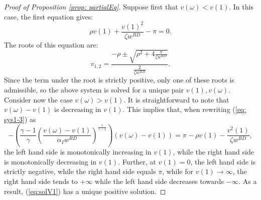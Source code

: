 \begin{proof}[Proof of Proposition \ref{prop: partialEq}]
Suppose first that $v(\omega)<v(1).$ In this case, the first equation
gives:
\[
\rho v(1)+\frac{v(1)^{2}}{\zeta w^{RD}}-\pi=0.
\]
The roots of this equation are:
\[
v_{1,2}=\frac{-\rho\pm\sqrt{\rho^{2}+4\frac{\pi}{\zeta w^{RD}}}}{\frac{2}{\zeta w^{RD}}}.
\]
Since the term under the root is strictly positive, only one of these
roots is admissible, so the above system is solved for a unique pair
$v(1),v(\omega).$ Consider now the case $v(\omega)>v(1).$ It is
straightforward to note that $v(\omega)-v(1)$ is decreasing in $v(1).$
This implies that, when rewriting (\ref{eq: sys1-3}) as
\begin{equation}
-\left(\frac{\gamma-1}{\gamma}\left(\frac{v(\omega)-v(1)}{\alpha_{I}w^{RD}}\right)^{\frac{1}{\gamma-1}}\right)\left(v(\omega)-v(1)\right)=\pi-\rho v(1)-\frac{v^{2}(1)}{\zeta w^{RD}},\label{eq:solV1}
\end{equation}
the left hand side is monotonically increasing in $v(1)$, while the
right hand side is monotonically decreasing in $v(1)$. Further, at
$v(1)=0$, the left hand side is strictly negative, while the right
hand side equals $\pi$, while for $v(1)\rightarrow\infty$, the right
hand side tends to $+\infty$ while the left hand side decreases towards
$-\infty$. As a result, (\ref{eq:solV1}) has a unique positive solution. 


\end{proof}
